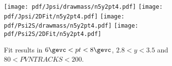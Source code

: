 \begin{figure}[H]
\begin{center}
\texttt{[image: pdf/Jpsi/drawmass/n5y2pt4.pdf]}
\texttt{[image: pdf/Jpsi/2DFit/n5y2pt4.pdf]}
\vspace*{-0.5cm}
\texttt{[image: pdf/Psi2S/drawmass/n5y2pt4.pdf]}
\texttt{[image: pdf/Psi2S/2DFit/n5y2pt4.pdf]}
\vspace*{-0.5cm}
\end{center}
\caption{Fit results in $6\gevc<pt<8\gevc$, $2.8<y<3.5$ and $80<PVNTRACKS<200$.}
\label{Fitn5y2pt4}
\end{figure}

